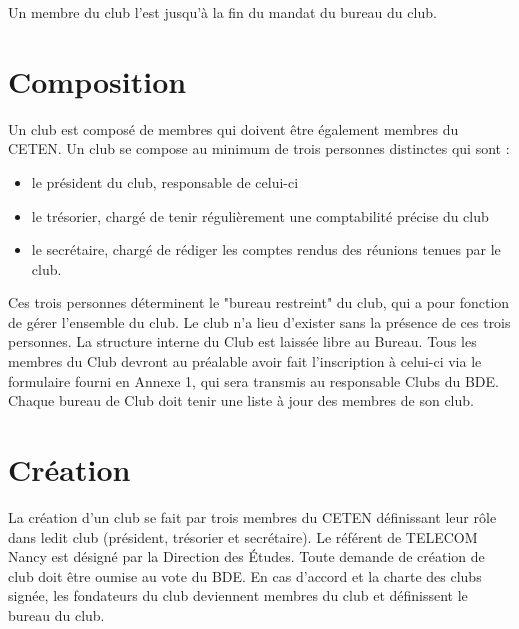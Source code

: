 \documentclass{article} %
\begin{document}
\begin{multicols}{2}
{			Un membre du club l’est jusqu’à la fin du mandat du bureau du club.}

		\section{Composition}
		
			{\small Un club est composé de membres qui doivent être également
			membres du CETEN. Un club se compose au minimum de trois personnes
			distinctes qui sont :
			\begin{itemize}
				\item le président du club, responsable de celui-ci
				\item le trésorier, chargé de tenir régulièrement une
					comptabilité précise du club
				\item le secrétaire, chargé de rédiger les comptes rendus des 
					réunions tenues par le club.
			\end{itemize}
			Ces trois personnes déterminent le "bureau restreint" du club, qui a
			pour fonction de gérer l’ensemble du club. Le club n’a lieu
			d’exister sans la présence de ces trois personnes. La structure
			interne du Club est laissée libre au Bureau.
			Tous les membres du Club devront au préalable avoir fait
			l’inscription à celui-ci via le formulaire fourni en Annexe 1, qui
			sera transmis au responsable Clubs du BDE.
			Chaque bureau de Club doit tenir une liste à jour des membres de son
			club.}
		
		\section{Création}
		
			{\small La création d’un club se fait par trois membres du CETEN
			définissant leur rôle dans ledit club (président, trésorier et
			secrétaire). Le référent de TELECOM Nancy est désigné par la
			Direction des Études. Toute demande de création de club doit être
			oumise au vote du BDE. En cas d’accord et la charte des clubs
			signée, les fondateurs du club deviennent membres du club et
			définissent le bureau du club.}


\end{multicols}
\end{document}
